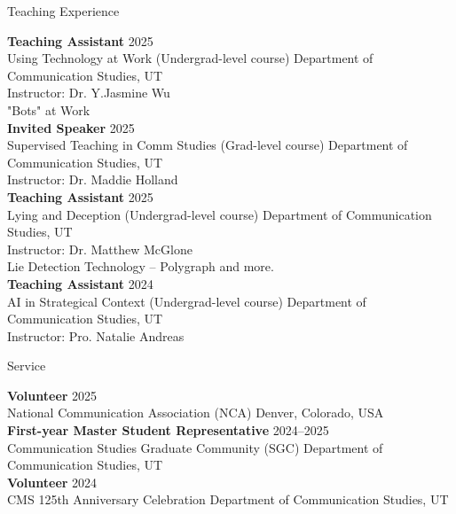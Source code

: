 \documentclass[
	11pt, %
]{resume} %
\begin{document}

\begin{rSection}{Teaching Experience}
	
    \textbf{Teaching Assistant} \hfill 2025 \\ 
    Using Technology at Work (Undergrad-level course) \hfill Department of Communication Studies, UT \\
    Instructor: Dr. Y.Jasmine Wu\\
\textbullet{} "Bots" at Work\\

    \textbf{Invited Speaker} \hfill 2025 \\ 
    Supervised Teaching in Comm Studies (Grad-level course) \hfill Department of Communication Studies, UT \\
    Instructor: Dr. Maddie Holland\\

    \textbf{Teaching Assistant} \hfill 2025 \\ 
    Lying and Deception (Undergrad-level course) \hfill Department of Communication Studies, UT \\
    Instructor: Dr. Matthew McGlone\\
\textbullet{} Lie Detection Technology – Polygraph and more.\\

    \textbf{Teaching Assistant} \hfill 2024 \\ 
    AI in Strategical Context (Undergrad-level course) \hfill Department of Communication Studies, UT \\
    Instructor: Pro. Natalie Andreas\\
    
\end{rSection}




\begin{rSection}{Service}
	
    \textbf{Volunteer} \hfill 2025 \\ 
    National Communication Association (NCA)  \hfill Denver, Colorado, USA \\

    \textbf{First-year Master Student Representative} \hfill 2024--2025 \\ 
    Communication Studies Graduate Community (SGC)  \hfill Department of Communication Studies, UT \\

    \textbf{Volunteer} \hfill 2024 \\ 
    CMS 125th Anniversary Celebration   \hfill Department of Communication Studies, UT \\

    
\end{rSection}
\end{document}
